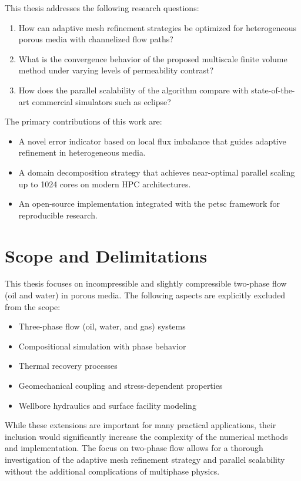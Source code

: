 This thesis addresses the following research questions:

\begin{enumerate}
    \item How can adaptive mesh refinement strategies be optimized for heterogeneous porous media with channelized flow paths?
    \item What is the convergence behavior of the proposed multiscale finite volume method under varying levels of permeability contrast?
    \item How does the parallel scalability of the algorithm compare with state-of-the-art commercial simulators such as \gls{eclipse}?
\end{enumerate}

The primary contributions of this work are:
\begin{itemize}
    \item A novel error indicator based on local flux imbalance that guides adaptive refinement in heterogeneous media.
    \item A domain decomposition strategy that achieves near-optimal parallel scaling up to 1024 cores on modern HPC architectures.
    \item An open-source implementation integrated with the \gls{petsc} framework for reproducible research.
\end{itemize}

\section{Scope and Delimitations}
\label{sec:introduction:scope}

This thesis focuses on incompressible and slightly compressible two-phase flow (oil and water) in porous media. The following aspects are explicitly excluded from the scope:

\begin{itemize}
    \item Three-phase flow (oil, water, and gas) systems
    \item Compositional simulation with phase behavior
    \item Thermal recovery processes
    \item Geomechanical coupling and stress-dependent properties
    \item Wellbore hydraulics and surface facility modeling
\end{itemize}

While these extensions are important for many practical applications, their inclusion would significantly increase the complexity of the numerical methods and implementation. The focus on two-phase flow allows for a thorough investigation of the adaptive mesh refinement strategy and parallel scalability without the additional complications of multiphase physics.


